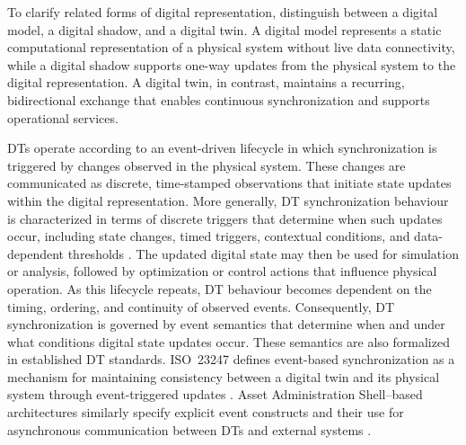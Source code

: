 To clarify related forms of digital representation, \citet{kritzinger2018digital} distinguish between a digital model, a digital shadow, and a digital twin. A digital model represents a static computational representation of a physical system without live data connectivity, while a digital shadow supports one-way updates from the physical system to the digital representation. A digital twin, in contrast, maintains a recurring, bidirectional exchange that enables continuous synchronization and supports operational services.

DTs operate according to an event-driven lifecycle in which synchronization is triggered by changes observed in the physical system. These changes are communicated as discrete, time-stamped observations that initiate state updates within the digital representation. More generally, DT synchronization behaviour is characterized in terms of discrete triggers that determine when such updates occur, including state changes, timed triggers, contextual conditions, and data-dependent thresholds \cite{alghamdi2024synchronization}. The updated digital state may then be used for simulation or analysis, followed by optimization or control actions that influence physical operation. As this lifecycle repeats, DT behaviour becomes dependent on the timing, ordering, and continuity of observed events. Consequently, DT synchronization is governed by event semantics that determine when and under what conditions digital state updates occur. These semantics are also formalized in established DT standards. ISO~23247 defines event-based synchronization as a mechanism for maintaining consistency between a digital twin and its physical system through event-triggered updates \cite{iso23247_1_2021}. Asset Administration Shell–based architectures similarly specify explicit event constructs and their use for asynchronous communication between DTs and external systems \cite{aas_details_2018_p1}.


